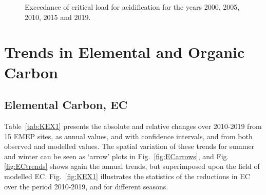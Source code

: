 \begin{figure}[ht]
 \caption{Exceedance of critical load for acidification for the years 2000, 2005, 2010, 2015 and 2019.}
\label{fig:acid}
\end{figure}





\clearpage

\section{Trends in Elemental and Organic Carbon}
\label{sec:trendsECOC}
\subsection{Elemental Carbon, EC}
\label{ss:trendsEC}

Table~\ref{tab:KEX1} presents the absolute and relative changes over 2010-2019 from 15 EMEP sites, as annual values, and with confidence intervals, and from both observed and modelled values. The spatial variation of these trends for summer and winter can be seen as `arrow' plots in Fig.~\ref{fig:ECarrows}, and Fig.\ref{fig:ECtrends} shows again the annual trends, but superimposed upon the field of modelled EC.
Fig.~\ref{fig:KEX1} illustrates the statistics of the reductions in EC over the period 2010-2019, and for different seasons. 

